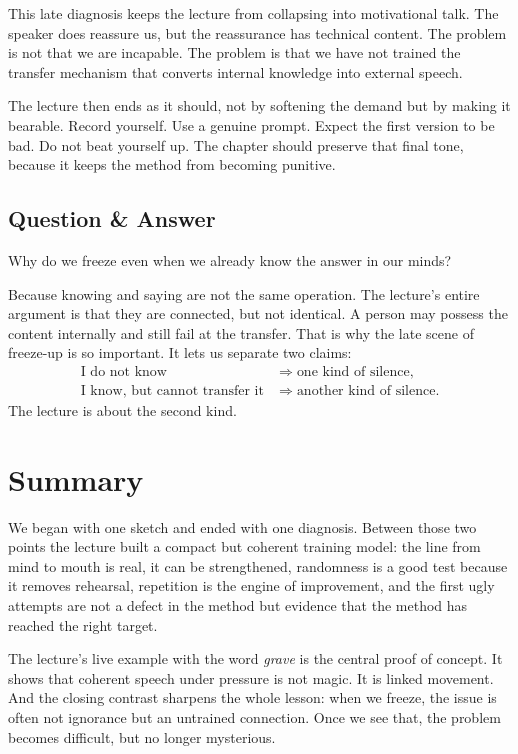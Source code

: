 This late diagnosis keeps the lecture from collapsing into motivational talk. The speaker does reassure us, but the reassurance has technical content. The problem is not that we are incapable. The problem is that we have not trained the transfer mechanism that converts internal knowledge into external speech.

The lecture then ends as it should, not by softening the demand but by making it bearable. Record yourself. Use a genuine prompt. Expect the first version to be bad. Do not beat yourself up. The chapter should preserve that final tone, because it keeps the method from becoming punitive.

\subsection{Question \& Answer}

Why do we freeze even when we already know the answer in our minds?

Because knowing and saying are not the same operation. The lecture's entire argument is that they are connected, but not identical. A person may possess the content internally and still fail at the transfer. That is why the late scene of freeze-up is so important. It lets us separate two claims:
\begin{align}
\text{I do not know} &\Longrightarrow \text{one kind of silence},\\
\text{I know, but cannot transfer it} &\Longrightarrow \text{another kind of silence}.
\end{align}
The lecture is about the second kind.

\section{Summary}

We began with one sketch and ended with one diagnosis. Between those two points the lecture built a compact but coherent training model: the line from mind to mouth is real, it can be strengthened, randomness is a good test because it removes rehearsal, repetition is the engine of improvement, and the first ugly attempts are not a defect in the method but evidence that the method has reached the right target.

The lecture's live example with the word \emph{grave} is the central proof of concept. It shows that coherent speech under pressure is not magic. It is linked movement. And the closing contrast sharpens the whole lesson: when we freeze, the issue is often not ignorance but an untrained connection. Once we see that, the problem becomes difficult, but no longer mysterious.